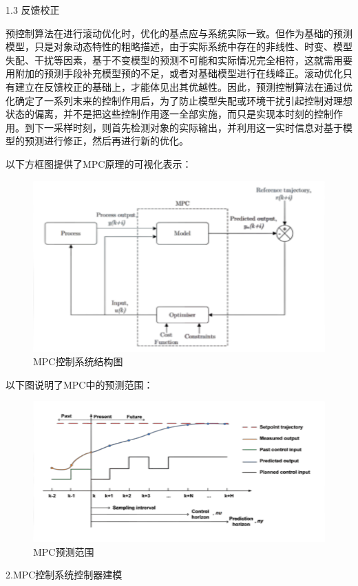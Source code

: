 1.3 反馈校正

预控制算法在进行滚动优化时，优化的基点应与系统实际一致。但作为基础的预测模型，只是对象动态特性的粗略描述，由于实际系统中存在的非线性、时变、模型失配、干扰等因素，基于不变模型的预测不可能和实际情况完全相符，这就需用要用附加的预测手段补充模型预的不足，或者对基础模型进行在线峰正。滚动优化只有建立在反馈校正的基础上，才能体见出其优越性。因此，预测控制算法在通过优化确定了一系列末来的控制作用后，为了防止模型失配或环境干扰引起控制对理想状态的偏离，并不是把这些控制作用逐一全部实施，而只是实现本时刻的控制作用。到下一采样时刻，则首先检测对象的实际输出，并利用这一实时信息对基于模型的预测进行修正，然后再进行新的优化。

以下方框图提供了MPC原理的可视化表示：

\begin{figure}[ht]
  \centering
  \includegraphics[width=0.8\linewidth]{./Figure/MPC-Control.png}
  \caption{MPC控制系统结构图}\label{Fig:xd1}
\end{figure}

以下图说明了MPC中的预测范围：

\begin{figure}[ht]
  \centering
  \includegraphics[width=0.8\linewidth]{./Figure/MPC-Prediction.png}
  \caption{MPC预测范围}\label{Fig:xd1}
\end{figure}

2.MPC控制系统控制器建模


